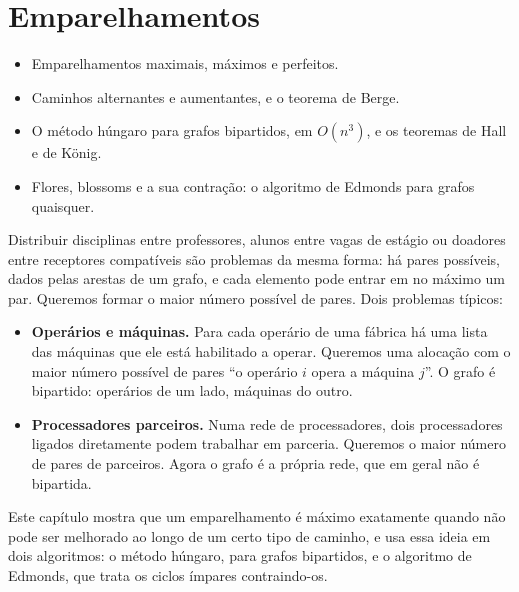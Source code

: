 \chapter{Emparelhamentos}\label{cap:emp}\label{sec:emparelhamentos}
\begin{objetivos}
\begin{itemize}
  \item Emparelhamentos maximais, máximos e perfeitos.
  \item Caminhos alternantes e aumentantes, e o teorema de Berge.
  \item O método húngaro para grafos bipartidos, em $O(n^3)$, e os teoremas de Hall e de König.
  \item Flores, blossoms e a sua contração: o algoritmo de Edmonds para grafos quaisquer.
\end{itemize}
\end{objetivos}

Distribuir disciplinas entre professores, alunos entre vagas de estágio ou doadores entre receptores compatíveis são problemas da mesma forma: há pares possíveis, dados pelas arestas de um grafo, e cada elemento pode entrar em no máximo um par. Queremos formar o maior número possível de pares. Dois problemas típicos:
\begin{itemize}
  \item \textbf{Operários e máquinas.} Para cada operário de uma fábrica há uma lista das máquinas que ele está habilitado a operar. Queremos uma alocação com o maior número possível de pares ``o operário $i$ opera a máquina $j$''. O grafo é bipartido: operários de um lado, máquinas do outro.
  \item \textbf{Processadores parceiros.} Numa rede de processadores, dois processadores ligados diretamente podem trabalhar em parceria. Queremos o maior número de pares de parceiros. Agora o grafo é a própria rede, que em geral não é bipartida.
\end{itemize}
Este capítulo mostra que um emparelhamento é máximo exatamente quando não pode ser melhorado ao longo de um certo tipo de caminho, e usa essa ideia em dois algoritmos: o método húngaro, para grafos bipartidos, e o algoritmo de Edmonds, que trata os ciclos ímpares contraindo-os.

